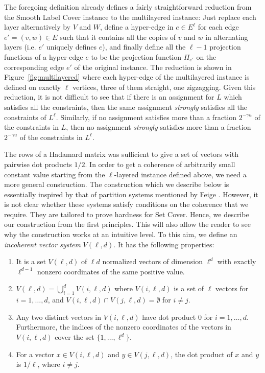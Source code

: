 \documentclass[11pt]{article}
\begin{document}
The foregoing definition already defines a fairly
straightforward reduction from the Smooth Label Cover instance
to the multilayered instance: Just replace each layer
alternatively by $V$ and $W$, define a hyper-edge in
$e \in E^{\ell}$ for each edge $e'=(v,w) \in E$ such that it
contains all the copies of $v$ and $w$ in alternating layers
(i.e. $e'$ uniquely defines $e$), and finally define all the
$\ell-1$ projection functions of a hyper-edge $e$ to be the
projection function $\Pi_{e'}$ on the corresponding edge $e'$
of the original instance. The reduction is shown in
Figure~\ref{fig:multilayered} where each hyper-edge of the
multilayered instance is defined on exactly $\ell$ vertices,
three of them straight, one zigzagging. Given this reduction,
it is not difficult to see that if there is an assignment for
$L$ which satisfies all the constraints, then the same assignment
\emph{strongly} satisfies all the constraints of $L^{\ell}$.
Similarly, if no assignment satisfies more than a fraction
$2^{-\gamma u}$ of the constraints in $L$, then no assignment
\emph{strongly} satisfies more than a fraction $2^{-\gamma u}$
of the constraints in $L^{\ell}$.

The rows of a Hadamard matrix was sufficient to give a set
of vectors with pairwise dot products $1/2$. In order to get
a coherence of arbitrarily small constant value starting
from the $\ell$-layered instance defined above, we need a
more general construction. The construction which we describe
below is essentially inspired by that of partition systems
mentioned by Feige \cite{Feige}. However, it is not clear
whether these systems satisfy conditions on the coherence
that we require. They are tailored to prove hardness for Set
Cover. Hence, we describe our construction from the first
principles. This will also allow the reader to see why the
construction works at an intuitive level. To this aim, we
define an \emph{incoherent vector system} $V(\ell,d)$. It
has the following properties:

\begin{enumerate}
\item It is a set $V(\ell,d)$ of $\ell d$ normalized vectors of
dimension $\ell^d$ with exactly $\ell^{d-1}$ nonzero coordinates of the
same positive value.

\item $V(\ell,d) = \bigcup_{i=1}^d V(i,\ell,d)$ where
$V(i,\ell,d)$ is a set of $\ell$ vectors for $i = 1, \hdots, d$,
and $V(i,\ell,d) \cap V(j,\ell,d) = \emptyset$ for $i \neq j$.

\item Any two distinct vectors in $V(i,\ell,d)$ have dot product $0$ for $i
= 1, \hdots, d$. Furthermore, the indices of the nonzero
coordinates of the vectors in $V(i,\ell,d)$ cover the set $\{1,
\hdots, \ell^d\}$.

\item For a vector $x \in V(i,\ell,d)$ and $y \in V(j,\ell,d)$,
the dot product of $x$ and $y$ is $1/\ell$, where $i \neq j$.
\end{enumerate}
\end{document}
